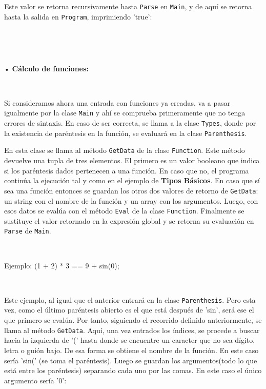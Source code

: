 \documentclass{article}
\begin{document}
\ 





\ 


Este valor se retorna recursivamente hasta {\texttt{Parse}} en {\texttt{Main}},
y de aquí se retorna hasta la salida en {\texttt{Program}}, imprimiendo 'true':


\ 





\


• \textbf{Cálculo de funciones:}


\


Si consideramos ahora una entrada con funciones ya creadas, va a pasar igualmente por la clase {\texttt{Main}} y ahí 
se comprueba primeramente que no tenga errores de sintaxis. En caso de ser correcta, se llama a la clase {\texttt{Types}}, 
donde por la existencia de paréntesis en la función, se evaluará en la clase {\texttt{Parenthesis}}. 


En esta clase se llama al método {\texttt{GetData}} de la clase {\texttt{Function}}. Este método devuelve una tupla de
tres elementos. El primero es un valor booleano que indica si los paréntesis dados pertenecen a una función. En caso que
no, el programa continúa la ejecución tal y como en el ejemplo de {\textbf{Tipos Básicos}}. En caso que sí sea una función
entonces se guardan los otros dos valores de retorno de {\texttt{GetData}}: un string con el nombre de la función y un
array con los argumentos. Luego, con esos datos se evalúa con el método {\texttt{Eval}} de la clase {\texttt{Function}}.
Finalmente se sustituye el valor retornado en la expresión global y se retorna su evaluación en {\texttt{Parse}} de
{\texttt{Main}}.   


\


Ejemplo: (1 + 2) * 3 == 9 + sin(0);


\


Este ejemplo, al igual que el anterior entrará en la clase {\texttt{Parenthesis}}. Pero esta vez, como el último paréntesis
abierto es el que está después de 'sin', será ese el que primero se evalúa. Por tanto, siguiendo el recorrido definido
anteriormente, se llama al método {\texttt{GetData}}. Aquí, una vez entrados los índices, se procede a buscar hacia la izquierda
de '(' hasta donde se encuentre un caracter que no sea dígito, letra o guión bajo. De esa forma se obtiene el nombre de
la función. En este caso sería 'sin(' (se toma el paréntesis). Luego se guardan los argumentos(todo lo que está entre los paréntesis) separando
cada uno por las comas. En este caso el único argumento sería '0':
\end{document}
